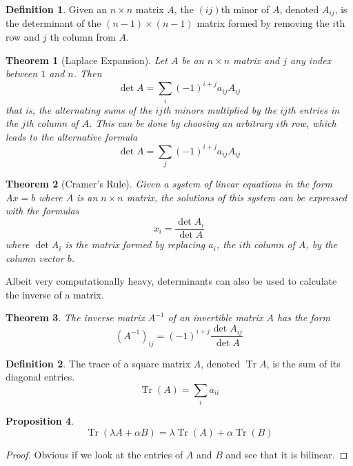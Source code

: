 \documentclass{article}
\DeclareMathOperator{\Tr}{Tr}
\newtheorem{theorem}{Theorem}[section]
\newtheorem{proposition}[theorem]{Proposition}
\theoremstyle{remark}
\theoremstyle{definition}
\newtheorem{definition}{Definition}[section]
\begin{document}
  \begin{definition}
  Given an $n \times n$ matrix $A$, the $(i j)$th minor of $A$, denoted $A_{i j}$, is the determinant of the $(n-1) \times (n-1)$ matrix formed by removing the $i$th row and $j$ th column from $A$. 
  \end{definition}

  \begin{theorem}[Laplace Expansion]
  Let $A$ be an $n \times n$ matrix and $j$ any index between $1$ and $n$. Then
  \[\det{A} = \sum_i (-1)^{i + j} a_{i j} A_{i j}\]
  that is, the alternating sums of the $ij$th minors multiplied by the $ij$th entries in the $j$th column of $A$. This can be done by choosing an arbitrary $i$th row, which leads to the alternative formula 
  \[\det{A} = \sum_j (-1)^{i + j} a_{i j} A_{i j} \]
  \end{theorem}

  \begin{theorem}[Cramer's Rule]
  Given a system of linear equations in the form $A x = b$ where $A$ is an $n \times n$ matrix, the solutions of this system can be expressed with the formulas 
  \[ x_i = \frac{ \det{A_i}}{\det{A}}\]
  where $\det{A_i}$ is the matrix formed by replacing $a_i$, the $i$th column of $A$, by the column vector $b$. 
  \end{theorem}

  Albeit very computationally heavy, determinants can also be used to calculate the inverse of a matrix. 

  \begin{theorem}
  The inverse matrix $A^{-1}$ of an invertible matrix $A$ has the form 
  \[(A^{-1})_{i j} = (-1)^{i+j} \frac{\det{A_{i j}}}{\det{A}}\]
  \end{theorem}

  \begin{definition}
  The trace of a square matrix $A$, denoted $\Tr{A}$, is the sum of its diagonal entries. 
  \[\Tr(A) = \sum_{i} a_{ii}\]
  \end{definition}

  \begin{proposition}
  \[\Tr(\lambda A + \alpha B) = \lambda \Tr(A) + \alpha \Tr(B)\]
  \end{proposition}
  \begin{proof}
  Obvious if we look at the entries of $A$ and $B$ and see that it is bilinear.
  \end{proof}
\end{document}
